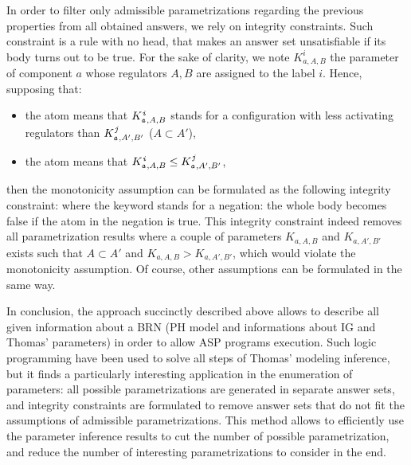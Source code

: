 In order to filter only admissible parametrizations regarding the previous properties from all obtained answers, we rely on integrity constraints.
Such constraint is a rule with no head, that makes an answer set unsatisfiable if its body turns out to be true.
For the sake of clarity, we note $K^i_{a,A,B}$ the parameter of component $a$ whose regulators $A,B$ are assigned to the label $i$. Hence, supposing that:
\begin{itemize}
  \item the  atom means that $K^{\texttt{\textit{i}}}_{\texttt{\textit{a}},A,B}$ stands for a configuration with less activating regulators than $K^{\texttt{\textit{j}}}_{\texttt{\textit{a}},A',B'}$ (\ie $A \subset A'$),
  \item the  atom means that $K^{\texttt{\textit{i}}}_{\texttt{\textit{a}},A,B} \leq K^{\texttt{\textit{j}}}_{\texttt{\textit{a}},A',B'}$,
\end{itemize}
then the monotonicity assumption can be formulated as the following integrity constraint:
where the  keyword stands for a negation: the whole body becomes false if the atom in the negation is true. This integrity constraint indeed removes all parametrization results where a couple of parameters $K_{a,A,B}$ and $K_{a,A',B'}$ exists such that $A \subset A'$ and $K_{a,A,B} > K_{a,A',B'}$, which would violate the monotonicity assumption. Of course, other assumptions can be formulated in the same way.

In conclusion, the approach succinctly described above allows to describe all given information about a BRN (PH model and informations about IG and Thomas' parameters) in order to allow ASP programs execution.
Such logic programming have been used to solve all steps of Thomas' modeling inference, but it finds a particularly interesting application in the enumeration of parameters: all possible parametrizations are generated in separate answer sets, and integrity constraints are formulated to remove answer sets that do not fit the assumptions of admissible parametrizations.
This method allows to efficiently use the parameter inference results to cut the number of possible parametrization, and reduce the number of interesting parametrizations to consider in the end.
